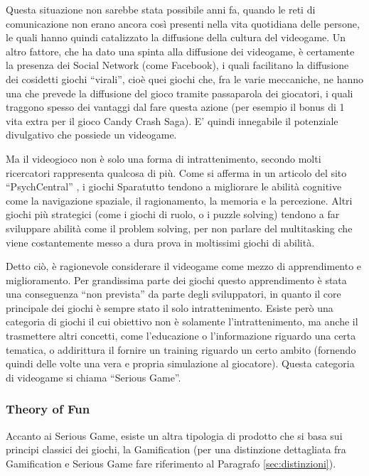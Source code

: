 Questa situazione non sarebbe stata possibile anni fa, quando le reti di comunicazione non erano ancora così presenti nella vita quotidiana delle persone, le quali hanno quindi catalizzato la diffusione della cultura del videogame. Un altro fattore, che ha dato una spinta alla diffusione dei videogame, è certamente la presenza dei Social Network (come Facebook), i quali facilitano la diffusione dei cosidetti giochi ``virali'', cioè quei giochi che, fra le varie meccaniche, ne hanno una che prevede la diffusione del gioco tramite passaparola dei giocatori, i quali traggono spesso dei vantaggi dal fare questa azione (per esempio il bonus di 1 vita extra per il gioco Candy Crash Saga). E' quindi innegabile il potenziale divulgativo che possiede un videogame.

Ma il videogioco non è solo una forma di intrattenimento, secondo molti ricercatori rappresenta qualcosa di più.
Come si afferma in un articolo del sito ``PsychCentral'' \cite{phychcentral}, i giochi Sparatutto tendono a migliorare le abilità cognitive come la navigazione spaziale, il ragionamento, la memoria e la percezione. 
Altri giochi più strategici (come i giochi di ruolo, o i puzzle solving) tendono a far sviluppare abilità come il problem solving, per non parlare del multitasking che viene costantemente messo a dura prova in moltissimi giochi di abilità.


Detto ciò, è ragionevole considerare il videogame come mezzo di apprendimento e miglioramento. Per grandissima parte dei giochi questo apprendimento è stata una conseguenza ``non prevista'' da parte degli sviluppatori, 
in quanto il core principale dei giochi è sempre stato il solo intrattenimento. Esiste però una categoria di giochi il cui obiettivo non è solamente l'intrattenimento, ma anche il trasmettere altri concetti, come l'educazione o l'informazione riguardo una certa tematica, o addirittura il fornire un training riguardo un certo ambito (fornendo quindi delle volte una vera e propria simulazione al giocatore). Questa categoria di videogame si chiama ``Serious Game''.

\subsubsection{Theory of Fun}

Accanto ai Serious Game, esiste un altra tipologia di prodotto che si basa sui principi classici dei giochi, la Gamification (per una distinzione dettagliata fra Gamification e Serious Game fare riferimento al Paragrafo \ref{sec:distinzioni}).


